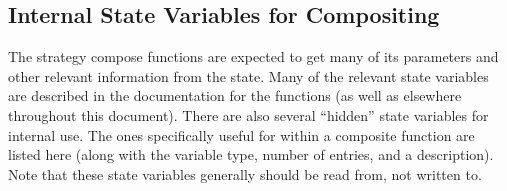 \subsection{Internal State Variables for Compositing}

The strategy compose functions are expected to get many of its parameters
and other relevant information from the \IceT state.  Many of the relevant
state variables are described in the documentation for the 
functions (as well as elsewhere throughout this document).  There are also
several ``hidden'' state variables for internal use.  The ones specifically
useful for within a composite function are listed here (along with the
variable type, number of entries, and a description).  Note that these
state variables generally should be read from, not written to.

